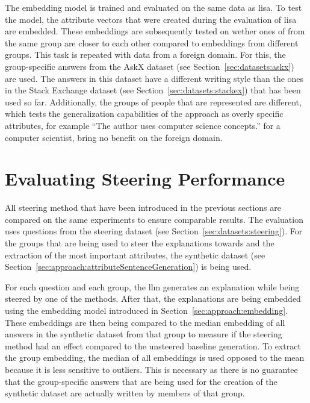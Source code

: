 The embedding model is trained and evaluated on the same data as \ac{lisa}. To test the model, the attribute vectors that were created during the evaluation of \ac{lisa} are embedded. These embeddings are subsequently tested on wether ones of from the same group are closer to each other compared to embeddings from different groups. %
This task is repeated with data from a foreign domain. For this, the group-specific answers from the AskX %
dataset (see Section~\ref{sec:datasets:askx}) are used. The answers in this dataset have a different writing style than the ones in the Stack Exchange dataset (see Section~\ref{sec:datasets:stackex}) that has been used so far. Additionally, the groups of people that are represented are different, which tests the generalization capabilities of the approach as overly specific attributes, for example \enquote{The author uses computer science concepts.} for a computer scientist, bring no benefit on the foreign domain.

\section{Evaluating Steering Performance}
\label{sec:experiments:steering}
All steering method that have been introduced in the previous sections are compared on the same experiments to ensure comparable results. The evaluation uses questions from the steering dataset (see Section~\ref{sec:datasets:steering}). For the groups that are being used to steer the explanations towards and the extraction of the most important attributes, the synthetic dataset (see Section~\ref{sec:approach:attributeSentenceGeneration}) is being used.

For each question and each group, the \ac{llm} generates an explanation while being steered by one of the methods. After that, the explanations are being embedded using the embedding model introduced in Section~\ref{sec:approach:embedding}. These embeddings are then being compared to the median embedding of all answers in the synthetic dataset from that group to measure if the steering method had an effect compared to the unsteered baseline generation.
To extract the group embedding, the median of all embeddings is used opposed to the mean because it is less sensitive to outliers. This is necessary as there is no guarantee that the group-specific answers that are being used for the creation of the synthetic dataset are actually written by members of that group.
